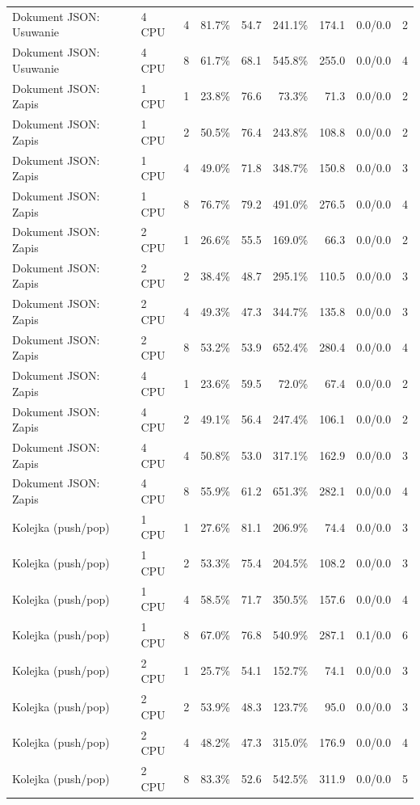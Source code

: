 \begin{table}[ht]
{\begin{tabular}{llcrrrrcc}
Dokument JSON: Usuwanie & 4 CPU & 4 & 81.7\% & 54.7 & 241.1\% & 174.1 & 0.0/0.0 & 2 \\
Dokument JSON: Usuwanie & 4 CPU & 8 & 61.7\% & 68.1 & 545.8\% & 255.0 & 0.0/0.0 & 4 \\
Dokument JSON: Zapis & 1 CPU & 1 & 23.8\% & 76.6 & 73.3\% & 71.3 & 0.0/0.0 & 2 \\
Dokument JSON: Zapis & 1 CPU & 2 & 50.5\% & 76.4 & 243.8\% & 108.8 & 0.0/0.0 & 2 \\
Dokument JSON: Zapis & 1 CPU & 4 & 49.0\% & 71.8 & 348.7\% & 150.8 & 0.0/0.0 & 3 \\
Dokument JSON: Zapis & 1 CPU & 8 & 76.7\% & 79.2 & 491.0\% & 276.5 & 0.0/0.0 & 4 \\
Dokument JSON: Zapis & 2 CPU & 1 & 26.6\% & 55.5 & 169.0\% & 66.3 & 0.0/0.0 & 2 \\
Dokument JSON: Zapis & 2 CPU & 2 & 38.4\% & 48.7 & 295.1\% & 110.5 & 0.0/0.0 & 3 \\
Dokument JSON: Zapis & 2 CPU & 4 & 49.3\% & 47.3 & 344.7\% & 135.8 & 0.0/0.0 & 3 \\
Dokument JSON: Zapis & 2 CPU & 8 & 53.2\% & 53.9 & 652.4\% & 280.4 & 0.0/0.0 & 4 \\
Dokument JSON: Zapis & 4 CPU & 1 & 23.6\% & 59.5 & 72.0\% & 67.4 & 0.0/0.0 & 2 \\
Dokument JSON: Zapis & 4 CPU & 2 & 49.1\% & 56.4 & 247.4\% & 106.1 & 0.0/0.0 & 2 \\
Dokument JSON: Zapis & 4 CPU & 4 & 50.8\% & 53.0 & 317.1\% & 162.9 & 0.0/0.0 & 3 \\
Dokument JSON: Zapis & 4 CPU & 8 & 55.9\% & 61.2 & 651.3\% & 282.1 & 0.0/0.0 & 4 \\
Kolejka (push/pop) & 1 CPU & 1 & 27.6\% & 81.1 & 206.9\% & 74.4 & 0.0/0.0 & 3 \\
Kolejka (push/pop) & 1 CPU & 2 & 53.3\% & 75.4 & 204.5\% & 108.2 & 0.0/0.0 & 3 \\
Kolejka (push/pop) & 1 CPU & 4 & 58.5\% & 71.7 & 350.5\% & 157.6 & 0.0/0.0 & 4 \\
Kolejka (push/pop) & 1 CPU & 8 & 67.0\% & 76.8 & 540.9\% & 287.1 & 0.1/0.0 & 6 \\
Kolejka (push/pop) & 2 CPU & 1 & 25.7\% & 54.1 & 152.7\% & 74.1 & 0.0/0.0 & 3 \\
Kolejka (push/pop) & 2 CPU & 2 & 53.9\% & 48.3 & 123.7\% & 95.0 & 0.0/0.0 & 3 \\
Kolejka (push/pop) & 2 CPU & 4 & 48.2\% & 47.3 & 315.0\% & 176.9 & 0.0/0.0 & 4 \\
Kolejka (push/pop) & 2 CPU & 8 & 83.3\% & 52.6 & 542.5\% & 311.9 & 0.0/0.0 & 5 \\

\end{tabular}}
\end{table}
